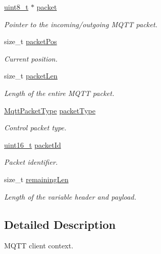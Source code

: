 \begin{DoxyCompactItemize}
\hyperlink{stdint_8h_aba7bc1797add20fe3efdf37ced1182c5}{uint8\+\_\+t} $\ast$ \hyperlink{struct__MqttClientContext_aaa6381cca1b61a980f72980bf860ccfa}{packet}
\begin{DoxyCompactList}\small\item\em Pointer to the incoming/outgoing M\+Q\+TT packet. \end{DoxyCompactList}\item 
size\+\_\+t \hyperlink{struct__MqttClientContext_a1901c18ec0447ad6de5a78bda42906ee}{packet\+Pos}
\begin{DoxyCompactList}\small\item\em Current position. \end{DoxyCompactList}\item 
size\+\_\+t \hyperlink{struct__MqttClientContext_af748febf04cd7bf9d33f61305ee6a9c1}{packet\+Len}
\begin{DoxyCompactList}\small\item\em Length of the entire M\+Q\+TT packet. \end{DoxyCompactList}\item 
\hyperlink{mqtt__common_8h_af26b642b7ef813ac269f70aa245cc796}{Mqtt\+Packet\+Type} \hyperlink{struct__MqttClientContext_a415d74e2059829a1e52fb4e45c6c1fbf}{packet\+Type}
\begin{DoxyCompactList}\small\item\em Control packet type. \end{DoxyCompactList}\item 
\hyperlink{stdint_8h_a273cf69d639a59973b6019625df33e30}{uint16\+\_\+t} \hyperlink{struct__MqttClientContext_a8219a0cbaf21dac4744ce120a5e12582}{packet\+Id}
\begin{DoxyCompactList}\small\item\em Packet identifier. \end{DoxyCompactList}\item 
size\+\_\+t \hyperlink{struct__MqttClientContext_a7e6fefef3fa8dba77c9eb6a2ea78ad1c}{remaining\+Len}
\begin{DoxyCompactList}\small\item\em Length of the variable header and payload. \end{DoxyCompactList}\end{DoxyCompactItemize}


\subsection{Detailed Description}
M\+Q\+TT client context. 

